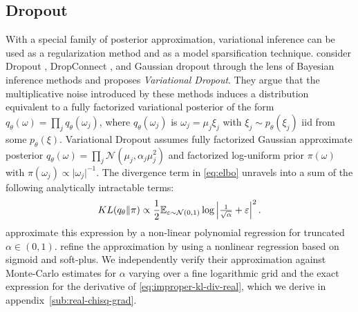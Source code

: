 \documentclass[a4paper,10pt]{article}
\begin{document}
\subsection{Dropout} %
\label{sub:dropout}

With a special family of posterior approximation, variational inference can be used as
a regularization method and as a model sparsification technique. \citet{kingma_variational_2015}
consider Dropout \citep{hinton_improving_2012}, DropConnect \citep{wan_regularization_2013},
and Gaussian dropout \citep{srivastava_dropout_2014,wang_fast_2013} through the lens
of Bayesian inference methods and proposes \textit{Variational Dropout}. They argue that
the multiplicative noise introduced by these methods induces a distribution equivalent to
a fully factorized variational posterior of the form $
  q_\theta(\omega) = \prod_j q_{\theta}(\omega_j)
$, where $q_{\theta}(\omega_j)$ is $\omega_j = \mu_j \xi_j$ with $
  \xi_j \sim p_\theta(\xi_j)
$ iid from some $p_\theta(\xi)$.
%
%
Variational Dropout assumes fully factorized Gaussian approximate posterior $
  q_\theta(\omega)
    = \prod_j \mathcal{N}(\mu_j, \alpha_j \mu_j^2)
$ and factorized log-uniform prior $\pi(\omega)$ with $
  \pi(\omega_j) \propto \lvert \omega_j \rvert^{-1}
$. The divergence term in \eqref{eq:elbo} unravels into a sum of the following
analytically intractable terms:
\begin{equation}  \label{eq:improper-kl-div-real}
  KL(q_\theta \| \pi)
    \propto
      \frac12 \mathbb{E}_{\varepsilon \sim \mathcal{N}(0, 1)}
        \log{\Bigl\lvert \tfrac1{\sqrt{\alpha}} + \varepsilon \Bigr\rvert^2}
  \,.
\end{equation}
\citet{kingma_variational_2015} approximate this expression by a non-linear polynomial
regression for truncated $\alpha \in (0, 1)$. \citet{molchanov_variational_2017}
refine the approximation by using a nonlinear regression based on sigmoid and soft-plus.
We independently verify their approximation against Monte-Carlo estimates for $\alpha$
varying over a fine logarithmic grid and the exact expression for the derivative of
\eqref{eq:improper-kl-div-real}, which we derive in appendix~\ref{sub:real-chisq-grad}.
\end{document}

